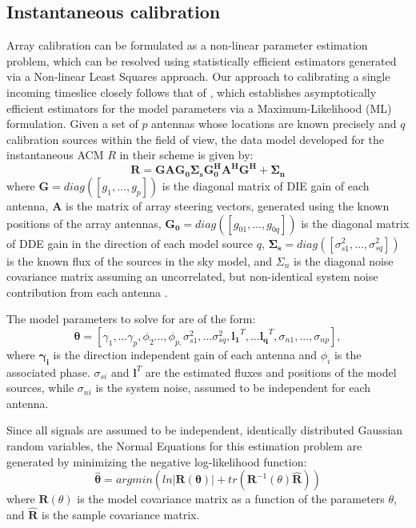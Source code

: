 \documentclass{aa}
\begin{document}
\subsection{Instantaneous calibration}

Array  calibration  can  be  formulated  as a  non-linear  parameter  estimation
problem,  which  can  be   resolved  using  statistically  efficient  estimators
generated via a Non-linear Least Squares approach. Our approach to calibrating a
single      incoming      timeslice       closely      follows      that      of
\citep{wijnholds2009multisource},  which  establishes  asymptotically  efficient
estimators   for   the   model   parameters  via   a   Maximum-Likelihood   (ML)
formulation. Given a set of $p$ antennas whose locations are known precisely and
$q$ calibration sources  within the field of view, the  data model developed for
the instantaneous ACM $R$ in their scheme is given by:
\begin{equation}
\mathbf{R=GAG_{0}\Sigma_{s}G_{0}^{H}A^{H}G^{H}+\Sigma_{n}}\label{eq:datamodel}
\end{equation}
where    \textbf{$\mathbf{G=}diag(\left[g_{1},\ldots,g_{p}\right])$    }is   the
diagonal matrix of DIE gain of each antenna, $\mathbf{A}$ is the matrix of array
steering vectors,  generated using  the known positions  of the  array antennas,
$\mathbf{G_{0}=}diag(\left[g_{01},\ldots,g_{0q}\right])$ is  the diagonal matrix
of    DDE   gain    in   the    direction    of   each    model   source    $q$,
$\mathbf{\Sigma_{s}}=diag\left(\left[\sigma_{s1}^{2},\ldots,\sigma_{sq}^{2}\right]\right)$
is the  known flux  of the  sources in the  sky model,  and $\Sigma_{n}$  is the
diagonal  noise covariance  matrix assuming  an uncorrelated,  but non-identical
system noise contribution from each antenna .

The model parameters to solve for are of the form:
\begin{equation}
\bm{\theta}=[\gamma_{1},\ldots\gamma_{p},\phi_{2}...,\phi_{p,}\sigma_{s1}^{2},...\sigma_{sq}^{2},\mathbf{l_{1}}^{T},...\mathbf{l_{q}}^{T},\sigma_{n1},...,\sigma_{np}],\label{eq:estparam}
\end{equation}
 where $\mathbf{\gamma_{i}}$  is the direction independent gain  of each antenna
 and $\phi_{i}$ is the  associated phase. $\sigma_{si}$ and $\mathbf{l}^{T}$ are
 the estimated fluxes and positions of the model sources, while $\sigma_{ni}$ is
 the system noise, assumed to be independent for each antenna.

Since  all  signals  are  assumed  to be  independent,  identically  distributed
Gaussian random variables, the Normal  Equations for this estimation problem are
generated by minimizing the negative log-likelihood function:
\begin{equation}
\bm{\hat{\theta}}=argmin\left(ln|\mathbf{R(\theta)}|+tr(\mathbf{R}^{-1}(\theta)\mathbf{\widehat{R}})\right)\label{eq:normeq}
\end{equation}
 where $\mathbf{R}(\theta)$ is the model  covariance matrix as a function of the
 parameters  $\theta$,  and  $\mathbf{\widehat{R}}$  is  the  sample  covariance
 matrix.
\end{document}
